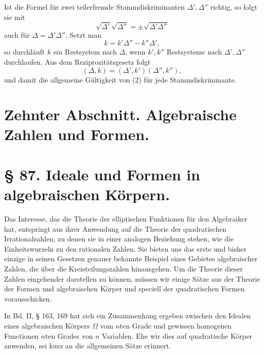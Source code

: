 \documentclass[11pt]{article}
\begin{document}
Ist die Formel für zwei teilerfremde Stammdiskriminanten \(\Delta',\Delta''\) richtig, so folgt sie mit
\begin{equation}
        \sqrt{\Delta'}\sqrt{\Delta''}=\pm\sqrt{\Delta'\Delta''}
\tag{3}
\end{equation}
auch für \(\Delta=\Delta'\Delta''\).  Setzt man
\[
        k=k'\Delta''-k''\Delta',
\]
so durchläuft \(k\) ein Restsystem nach \(\Delta\), wenn \(k',k''\) Restsysteme nach \(\Delta',\Delta''\) durchlaufen.  Aus dem Reziprozitätsgesetz folgt
\[
        (\Delta,k)=(\Delta',k')(
\Delta'',k''),
\]
und damit die allgemeine Gültigkeit von (2) für jede Stammdiskriminante.


\section*{Zehnter Abschnitt. Algebraische Zahlen und Formen.}

\section*{§ 87. Ideale und Formen in algebraischen Körpern.}

Das Interesse, das die Theorie der elliptischen Funktionen für den Algebraiker hat, entspringt aus ihrer Anwendung auf die Theorie der quadratischen Irrationalzahlen, zu denen sie in einer analogen Beziehung stehen, wie die Einheitswurzeln zu den rationalen Zahlen. Sie bieten uns das erste und bisher einzige in seinen Gesetzen genauer bekannte Beispiel eines Gebietes algebraischer Zahlen, die über die Kreisteilungszahlen hinausgehen. Um die Theorie dieser Zahlen eingehender darstellen zu können, müssen wir einige Sätze aus der Theorie der Formen und algebraischen Körper und speciell der quadratischen Formen vorausschicken.

In Bd. II, § 163, 169 hat sich ein Zusammenhang ergeben zwischen den Idealen eines algebraischen Körpers $\Omega$ vom $n$ten Grade und gewissen homogenen Functionen $n$ten Grades von $n$ Variablen. Ehe wir dies auf quadratische Körper anwenden, sei kurz an die allgemeinen Sätze erinnert.
\end{document}
